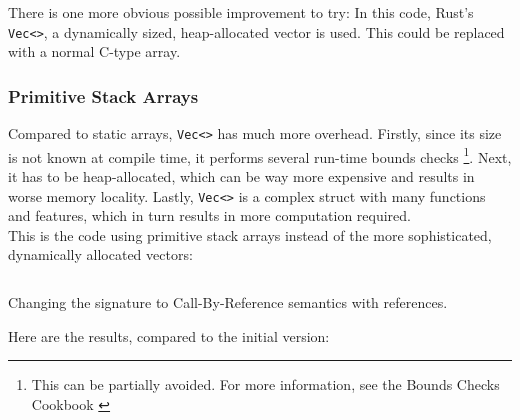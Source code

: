 There is one more obvious possible improvement to try: In this code, Rust's \texttt{Vec<>}, a dynamically sized, heap-allocated vector is used. This could be replaced with a normal C-type array.

\subsubsection{Primitive Stack Arrays}
Compared to static arrays, \texttt{Vec<>} has much more overhead. Firstly, since its size is not known at compile time, it performs several run-time bounds checks \footnote{This can be partially avoided. For more information, see the Bounds Checks Cookbook \cite{bounds_cookbook}}. Next, it has to be heap-allocated, which can be way more expensive and results in worse memory locality. Lastly, \texttt{Vec<>} is a complex struct with many functions and features, which in turn results in more computation required.\\

This is the code using primitive stack arrays instead of the more sophisticated, dynamically allocated vectors:

\begin{listing}[H]
  \inputminted{rust}{./assets/array.rs}
\caption{Changing the signature to Call-By-Reference semantics with references.}
\end{listing}

Here are the results, compared to the initial version:


